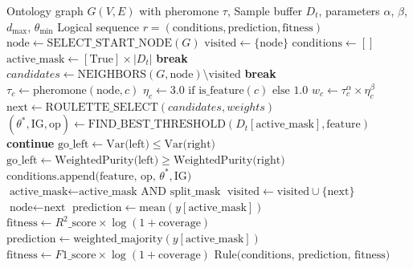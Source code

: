 \documentclass[preprint,12pt,authoryear]{elsarticle}
\begin{document}
\begin{algorithm}[hbt!]
\caption{Algorithm 1: EXTRACT\_RULE — Single Ant Rule Extraction}
\label{alg:single_ant}
\begin{algorithmic}[1]
\REQUIRE Ontology graph $G(V, E)$ with pheromone $\tau$, Sample buffer $D_t$, parameters $\alpha$, $\beta$, $d_{\max}$, $\theta_{\min}$
\ENSURE Logical sequence $r = (\text{conditions}, \text{prediction}, \text{fitness})$
\STATE $\text{node} \leftarrow \text{SELECT\_START\_NODE}(G)$
\STATE $\text{visited} \leftarrow \{\text{node}\}$
\STATE $\text{conditions} \leftarrow []$
\STATE $\text{active\_mask} \leftarrow [\text{True}] \times |D_t|$ 
        \STATE \textbf{break}
    \ENDIF
    \STATE $candidates \leftarrow \text{NEIGHBORS}(G, \text{node}) \setminus \text{visited}$
        \STATE \textbf{break}
    \ENDIF
        \STATE $\tau_c \leftarrow \text{pheromone}(\text{node}, c)$
        \STATE $\eta_c \leftarrow 3.0 \text{ if is\_feature}(c) \text{ else } 1.0$
        \STATE $w_c \leftarrow \tau_c^\alpha \times \eta_c^\beta$
    \ENDFOR
    \STATE $\text{next} \leftarrow \text{ROULETTE\_SELECT}(candidates, weights)$
        \STATE $(\theta^*, \text{IG}, \text{op}) \leftarrow \text{FIND\_BEST\_THRESHOLD}(D_t[\text{active\_mask}], \text{feature})$
            \STATE \textbf{continue}
        \ENDIF
            \STATE $\text{go\_left} \leftarrow \text{Var(left)} \le \text{Var(right)}$
        \ELSE
            \STATE $\text{go\_left} \leftarrow \text{WeightedPurity(left)} \ge \text{WeightedPurity(right)}$
        \ENDIF
        \STATE $\text{conditions.append(feature, op, } \theta^*, \text{IG)}$
        \STATE $\text{active\_mask} \leftarrow \text{active\_mask} \text{ AND split\_mask}$
    \ENDIF
    \STATE $\text{visited} \leftarrow \text{visited} \cup \{\text{next}\}$
    \STATE $\text{node} \leftarrow \text{next}$
\ENDFOR
{}
    \STATE $\text{prediction} \leftarrow \text{mean}(y[\text{active\_mask}])$
    \STATE $\text{fitness} \leftarrow R^2\text{\_score} \times \log(1 + \text{coverage})$
\ELSE
    \STATE $\text{prediction} \leftarrow \text{weighted\_majority}(y[\text{active\_mask}])$
    \STATE $\text{fitness} \leftarrow F1\text{\_score} \times \log(1 + \text{coverage})$
\ENDIF
\RETURN $\text{Rule(conditions, prediction, fitness)}$
\end{algorithmic}
\end{algorithm}
\end{document}
